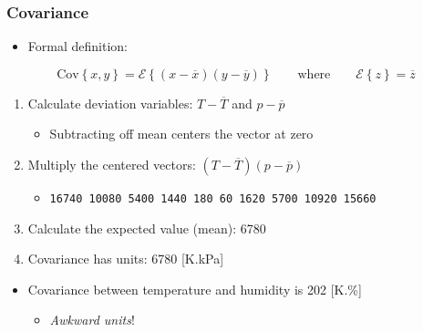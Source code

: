 \begin{frame}\frametitle{Covariance}
	\begin{itemize}
		\item	Formal definition:
	\end{itemize}
	$$ \text{Cov}\left\{x, y\right\} = \mathcal{E}\left\{ (x - \overline{x}) (y - \overline{y})\right\} \qquad \text{where} \qquad \mathcal{E}\left\{ z \right\} = \overline{z} $$

	\begin{enumerate}
		\item	Calculate deviation variables: $T - \overline{T}$ and $p - \overline{p}$
		\begin{itemize}
			\item	Subtracting off mean centers the vector at zero
		\end{itemize}
		\item	Multiply the centered vectors: $(T - \overline{T}) (p - \overline{p})$
		\begin{itemize}
			\item	\texttt{16740 10080 5400 1440 180 60 1620 5700 10920 15660}
		\end{itemize}
		\item	Calculate the expected value (mean): 6780
		\item	Covariance has units: 6780 [K.kPa]
	\end{enumerate}

	\vspace{12pt}
	\begin{itemize}
		\item	Covariance between temperature and humidity is 202 [K.\%]
		\begin{itemize}
			\item	\emph{Awkward units}!
		\end{itemize}
	\end{itemize}
\end{frame}

